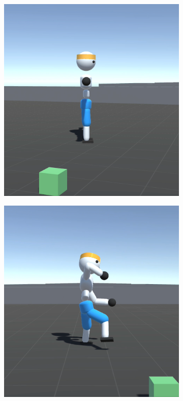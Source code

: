 \begin{figure}[H]
  \centering
  \begin{subfigure}{.3\textwidth}
    \centering
    \includegraphics[width=\textwidth]{img/charakter_walker_1}
  \end{subfigure}
  \begin{subfigure}{.3\textwidth}
    \centering
    \includegraphics[width=\textwidth]{img/charakter_walker_2}

\end{subfigure}
\end{figure}
